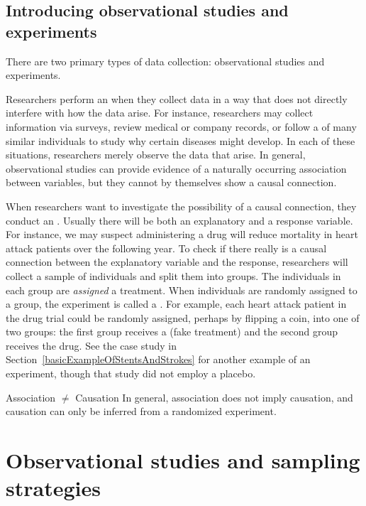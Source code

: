 \subsection{Introducing observational studies and experiments}

There are two primary types of data collection: observational studies and experiments.

Researchers perform an  when they collect data in a way that does not directly interfere with how the data arise. For instance, researchers may collect information via surveys, review medical or company records, or follow a  of many similar individuals to study why certain diseases might develop. In each of these situations, researchers merely observe the data that arise. In general, observational studies can provide evidence of a naturally occurring association between variables, but they cannot by themselves show a causal connection.

When researchers want to investigate the possibility of a causal connection, they conduct an . Usually there will be both an explanatory and a response variable. For instance, we may suspect administering a drug will reduce mortality in heart attack patients over the following year. To check if there really is a causal connection between the explanatory variable and the response, researchers will collect a sample of individuals and split them into groups. The individuals in each group are \emph{assigned} a treatment. When individuals are randomly assigned to a group, the experiment is called a . For example, each heart attack patient in the drug trial could be randomly assigned,  perhaps by flipping a coin, into one of two groups: the first group receives a  (fake treatment) and the second group receives the drug. See the case study in Section~\ref{basicExampleOfStentsAndStrokes} for another example of an experiment, though that study did not employ a placebo.

\begin{onebox}{Association $\neq$ Causation}
In general, association does not imply causation, and causation can only be inferred from a randomized experiment.
\end{onebox}


\section{Observational studies and sampling strategies}

